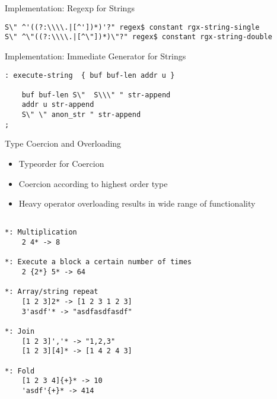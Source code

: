 \documentclass{beamer}
\begin{document}
\begin{frame}[fragile]

  \vspace{0.5cm}
Implementation: Regexp for Strings
    \small
\begin{verbatim}
S\" ^'((?:\\\\.|[^'])*)'?" regex$ constant rgx-string-single
S\" ^\"((?:\\\\.|[^\"])*)\"?" regex$ constant rgx-string-double
\end{verbatim}

  \vspace{0.5cm}
\large
Implementation: Immediate Generator for Strings
    \small
\begin{verbatim}
: execute-string  { buf buf-len addr u } 

    buf buf-len S\"  S\\\" " str-append 
    addr u str-append 
    S\" \" anon_str " str-append 
;
\end{verbatim}


\end{frame}



\begin{frame}
    Type Coercion and Overloading

    \begin{itemize}
        \item Typeorder for Coercion
        \item Coercion according to highest order type
        \item Heavy operator overloading results in wide range of functionality

    \end{itemize}
\end{frame}


\begin{frame}[fragile]

\small \begin{lstlisting}

*: Multiplication
    2 4* -> 8

*: Execute a block a certain number of times
    2 {2*} 5* -> 64

*: Array/string repeat
    [1 2 3]2* -> [1 2 3 1 2 3]
    3'asdf'* -> "asdfasdfasdf"

*: Join
    [1 2 3]','* -> "1,2,3"
    [1 2 3][4]* -> [1 4 2 4 3]

*: Fold
    [1 2 3 4]{+}* -> 10
    'asdf'{+}* -> 414

\end{lstlisting}

\end{frame}
\end{document}
